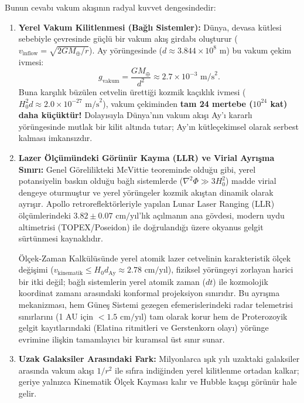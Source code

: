\documentclass[11pt,a4paper]{article}
\begin{document}
Bunun cevabı vakum akışının radyal kuvvet dengesindedir:
\begin{enumerate}
    \item \textbf{Yerel Vakum Kilitlenmesi (Bağlı Sistemler):} Dünya, devasa kütlesi sebebiyle çevresinde güçlü bir vakum akış girdabı oluşturur ($v_{\mathrm{inflow}} = \sqrt{2GM_\oplus/r}$). Ay yörüngesinde ($d \approx 3.844 \times 10^8\text{ m}$) bu vakum çekim ivmesi:
          \begin{equation}
              g_{\mathrm{vakum}} = \frac{GM_\oplus}{d^2} \approx 2.7 \times 10^{-3}\text{ m/s}^2.
          \end{equation}
          Buna karşılık büzülen cetvelin ürettiği kozmik kaçıklık ivmesi ($H_0^2 d \approx 2.0 \times 10^{-27}\text{ m/s}^2$), vakum çekiminden \textbf{tam 24 mertebe ($10^{24}$ kat) daha küçüktür!} Dolayısıyla Dünya'nın vakum akışı Ay'ı kararlı yörüngesinde mutlak bir kilit altında tutar; Ay'ın kütleçekimsel olarak serbest kalması imkansızdır.
    \item \textbf{Lazer Ölçümündeki Görünür Kayma (LLR) ve Virial Ayrışma Sınırı:} Genel Görelilikteki McVittie teoreminde olduğu gibi, yerel potansiyelin baskın olduğu bağlı sistemlerde ($\nabla^2\Phi \gg 3H_0^2$) madde virial dengeye oturmuştur ve yerel yörüngeler kozmik akıştan dinamik olarak ayrışır. Apollo retroreflektörleriyle yapılan Lunar Laser Ranging (LLR) ölçümlerindeki $3.82 \pm 0.07\text{ cm/yıl}$'lık açılmanın ana gövdesi, modern uydu altimetrisi (TOPEX/Poseidon) ile doğrulandığı üzere okyanus gelgit sürtünmesi kaynaklıdır.

          Ölçek-Zaman Kalkülüsünde yerel atomik lazer cetvelinin karakteristik ölçek değişimi ($v_{\mathrm{kinematik}} \le H_0 d_{\mathrm{Ay}} \approx 2.78\text{ cm/yıl}$), fiziksel yörüngeyi zorlayan harici bir itki değil; bağlı sistemlerin yerel atomik zaman ($dt$) ile kozmolojik koordinat zamanı arasındaki konformal projeksiyon sınırıdır. Bu ayrışma mekanizması, hem Güneş Sistemi gezegen efemerislerindeki radar telemetrisi sınırlarını (1 AU için $< 1.5\text{ cm/yıl}$) tam olarak korur hem de Proterozoyik gelgit kayıtlarındaki (Elatina ritmitleri ve Gerstenkorn olayı) yörünge evrimine ilişkin tamamlayıcı bir kuramsal üst sınır sunar.
    \item \textbf{Uzak Galaksiler Arasındaki Fark:} Milyonlarca ışık yılı uzaktaki galaksiler arasında vakum akışı $1/r^2$ ile sıfıra indiğinden yerel kilitlenme ortadan kalkar; geriye yalnızca Kinematik Ölçek Kayması kalır ve Hubble kaçışı görünür hale gelir.
\end{enumerate}
\end{document}
